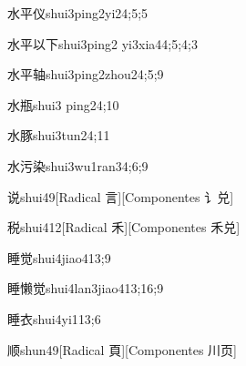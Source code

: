 \begin{verbete}{水平仪}{shui3ping2yi2}{4;5;5}
\end{verbete}

\begin{verbete}{水平以下}{shui3ping2 yi3xia4}{4;5;4;3}
\end{verbete}

\begin{verbete}{水平轴}{shui3ping2zhou2}{4;5;9}
\end{verbete}

\begin{verbete}{水瓶}{shui3 ping2}{4;10}
\end{verbete}

\begin{verbete}{水豚}{shui3tun2}{4;11}
\end{verbete}

\begin{verbete}{水污染}{shui3wu1ran3}{4;6;9}
\end{verbete}

\begin{verbete}{说}{shui4}{9}[Radical 言][Componentes 讠兑]
\end{verbete}

\begin{verbete}{税}{shui4}{12}[Radical 禾][Componentes 禾兑]
\end{verbete}

\begin{verbete}{睡觉}{shui4jiao4}{13;9}
\end{verbete}

\begin{verbete}{睡懒觉}{shui4lan3jiao4}{13;16;9}
\end{verbete}

\begin{verbete}{睡衣}{shui4yi1}{13;6}
\end{verbete}

\begin{verbete}{顺}{shun4}{9}[Radical 頁][Componentes 川页]
\end{verbete}

